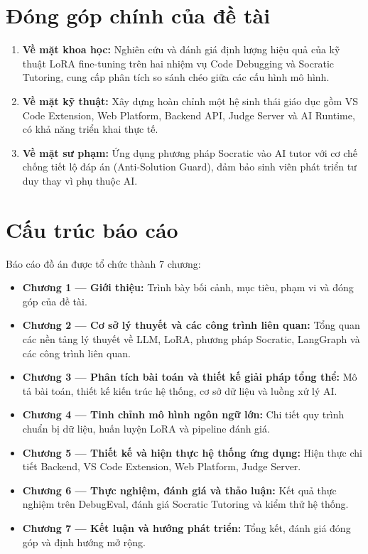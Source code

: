\section{Đóng góp chính của đề tài}

\begin{enumerate}
    \item \textbf{Về mặt khoa học:} Nghiên cứu và đánh giá định lượng hiệu quả của kỹ thuật LoRA fine-tuning trên hai nhiệm vụ Code Debugging và Socratic Tutoring, cung cấp phân tích so sánh chéo giữa các cấu hình mô hình.
    \item \textbf{Về mặt kỹ thuật:} Xây dựng hoàn chỉnh một hệ sinh thái giáo dục gồm VS Code Extension, Web Platform, Backend API, Judge Server và AI Runtime, có khả năng triển khai thực tế.
    \item \textbf{Về mặt sư phạm:} Ứng dụng phương pháp Socratic vào AI tutor với cơ chế chống tiết lộ đáp án (Anti-Solution Guard), đảm bảo sinh viên phát triển tư duy thay vì phụ thuộc AI.
\end{enumerate}

\section{Cấu trúc báo cáo}

Báo cáo đồ án được tổ chức thành 7 chương:

\begin{itemize}
    \item \textbf{Chương 1 --- Giới thiệu:} Trình bày bối cảnh, mục tiêu, phạm vi và đóng góp của đề tài.
    \item \textbf{Chương 2 --- Cơ sở lý thuyết và các công trình liên quan:} Tổng quan các nền tảng lý thuyết về LLM, LoRA, phương pháp Socratic, LangGraph và các công trình liên quan.
    \item \textbf{Chương 3 --- Phân tích bài toán và thiết kế giải pháp tổng thể:} Mô tả bài toán, thiết kế kiến trúc hệ thống, cơ sở dữ liệu và luồng xử lý AI.
    \item \textbf{Chương 4 --- Tinh chỉnh mô hình ngôn ngữ lớn:} Chi tiết quy trình chuẩn bị dữ liệu, huấn luyện LoRA và pipeline đánh giá.
    \item \textbf{Chương 5 --- Thiết kế và hiện thực hệ thống ứng dụng:} Hiện thực chi tiết Backend, VS Code Extension, Web Platform, Judge Server.
    \item \textbf{Chương 6 --- Thực nghiệm, đánh giá và thảo luận:} Kết quả thực nghiệm trên DebugEval, đánh giá Socratic Tutoring và kiểm thử hệ thống.
    \item \textbf{Chương 7 --- Kết luận và hướng phát triển:} Tổng kết, đánh giá đóng góp và định hướng mở rộng.
\end{itemize}
